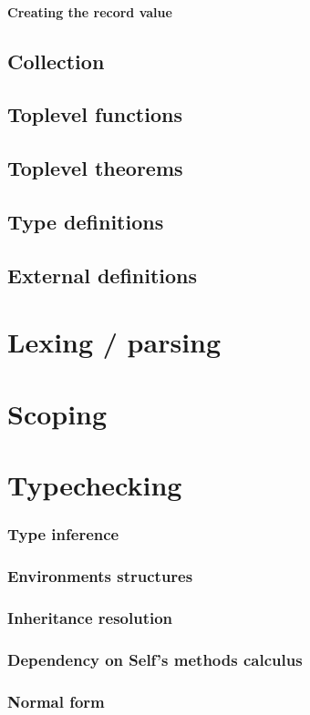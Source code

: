 \documentclass{book}
\begin{document}
\subsubsection{Creating the record value}
\section{Collection}
\section{Toplevel functions}
\section{Toplevel theorems}
\section{Type definitions}
\section{External definitions}

\chapter{Lexing / parsing}
\chapter{Scoping}

\chapter{Typechecking}
\subsection{Type inference}
\subsection{Environments structures}
\subsection{Inheritance resolution}
\subsection{Dependency on Self's methods calculus}
\subsection{Normal form}
\end{document}
